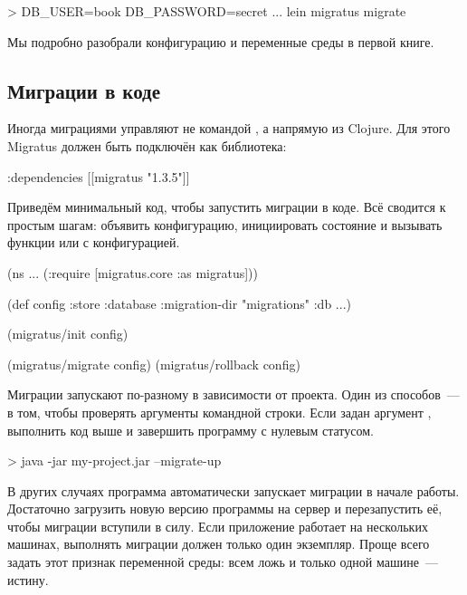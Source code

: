 \begin{english}
  \begin{bash}
> DB_USER=book DB_PASSWORD=secret ... lein migratus migrate
  \end{bash}
\end{english}

Мы подробно разобрали конфигурацию и переменные среды в первой книге.

\subsection{Миграции в коде}

Иногда миграциями управляют не командой , а напрямую из Clojure. Для этого Migratus должен быть подключён как библиотека:

\begin{english}
  \begin{clojure}
{:dependencies [[migratus "1.3.5"]]}
  \end{clojure}
\end{english}

Приведём минимальный код, чтобы запустить миграции в коде. Всё сводится к простым шагам: объявить конфигурацию, инициировать состояние и вызывать функции  или  с конфигурацией.

\begin{english}
  \begin{clojure}
(ns ...
  (:require
   [migratus.core :as migratus]))

(def config
  {:store :database
   :migration-dir "migrations"
   :db {...}})

(migratus/init config)

(migratus/migrate config)
(migratus/rollback config)
  \end{clojure}
\end{english}

Миграции запускают по-разному в зависимости от проекта. Один из способов~--- в том, чтобы проверять аргументы командной строки. Если задан аргумент , выполнить код выше и завершить программу с нулевым статусом.

\begin{english}
  \begin{bash}
> java -jar my-project.jar --migrate-up
  \end{bash}
\end{english}

В других случаях программа автоматически запускает миграции в начале работы. Достаточно загрузить новую версию программы на сервер и перезапустить её, чтобы миграции вступили в силу. Если приложение работает на нескольких машинах, выполнять миграции должен только один экземпляр. Проще всего задать этот признак переменной среды: всем ложь и только одной машине~--- истину.

